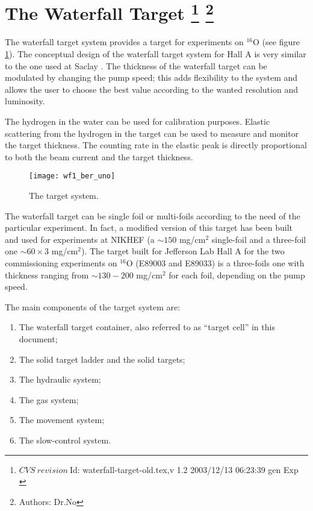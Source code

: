 \section[The Waterfall Target]{The Waterfall Target
\footnote{
  $ CVS~revision~ $Id: waterfall-target-old.tex,v 1.2 2003/12/13 06:23:39 gen Exp $ $
}
\footnote{Authors: Dr.No }
}

The waterfall target system provides a target for experiments on 
$^{16}$O (see figure \ref{fig:uno}). 
The conceptual design of the waterfall target system for Hall A  is
very similar to the one used at Saclay \cite{Garibaldi:1992mb}.
The thickness of the waterfall target can 
be modulated by changing the pump speed; this 
adds flexibility to the system and allows the user to choose the best
value according to the wanted resolution and luminosity.

The hydrogen in the water can be used for calibration purposes.
Elastic scattering  from the hydrogen in the target can be used to 
measure and monitor the target thickness. The counting rate in the elastic
peak is directly proportional to both the beam current and 
the target thickness.

\begin{figure}[htbp]
\begin{center}
\texttt{[image: wf1\_ber\_uno]}
\caption[Waterfall Target System]{The target system.}
\label{fig:uno}
\end{center}
\end{figure}


The waterfall target can be single foil or multi-foils according to
the need of the particular experiment. In fact, a modified version of this 
target has been built  and used for experiments at NIKHEF (a
$\sim 150$ mg/cm$^2$ single-foil and a three-foil one 
$\sim 60 \times 3$ mg/cm$^2$). 
The target built for Jefferson Lab Hall A for the two commissioning 
experiments on $^{16}$O (E89003 and E89033) is a three-foils  one  with 
thickness ranging from $\sim 130-200$ mg/cm$^2$ for each foil, 
depending on the pump speed. 

The main components of the target system are:
\begin{enumerate}
\item The waterfall target container, also referred to as ``target cell'' in this document;
\item The solid target ladder and the solid targets; 
\item The hydraulic system;
\item The gas system;
\item The movement system;
\item The slow-control system.
\end{enumerate}

